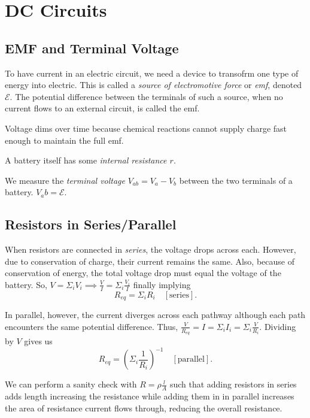 \chapter{DC Circuits}

\section{EMF and Terminal Voltage}

\begin{remark}
    To have current in an electric circuit, we need a device to transofrm one type of energy into electric. This is called a \emph{source of electromotive force} or \emph{emf}, denoted $\mathscr{E}$. The potential difference between the terminals of such a source, when no current flows to an external circuit, is called the emf.
\end{remark}
\begin{note}
    Voltage dims over time because chemical reactions cannot supply charge fast enough to maintain the full emf.
\end{note}
\begin{definition}
    A battery itself has some \emph{internal resistance $r$}.
\end{definition}
\begin{definition}
    We measure the \emph{terminal voltage} $V_{ab} = V_a - V_b$ between the two terminals of a battery. $V_ab = \mathscr{E}.$
\end{definition}

\section{Resistors in Series/Parallel}

\begin{remark}
    When resistors are connected in \emph{series}, the voltage drops across each. However, due to conservation of charge, their current remains the same. Also, because of conservation of energy, the total voltage drop must equal the voltage of the battery. So, $V = \Sigma_iV_i \implies \frac{V}{I} = \Sigma_i\frac{V_i}{I}$ finally implying $$R_{eq} = \Sigma_iR_i \quad [\text{series}].$$
\end{remark}
\begin{remark}
    In parallel, however, the current diverges across each pathway although each path encounters the same potential difference. Thus, $\frac{V}{R_{eq}} = I = \Sigma_iI_i = \Sigma_i\frac{V}{R_i}$. Dividing by $V$ gives us $$R_{eq} = (\Sigma_i\frac{1}{R_i})^{-1} \quad [\text{parallel}].$$
\end{remark}
\begin{remark}
    We can perform a sanity check with $R = \rho\frac{l}{A}$ such that adding resistors in series adds length increasing the resistance while adding them in in parallel increases the area of resistance current flows through, reducing the overall resistance.
\end{remark}

